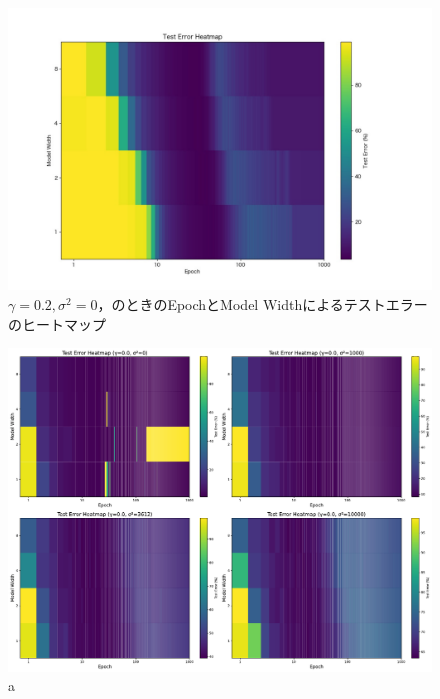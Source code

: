 \begin{figure}[H]
    \centering
    \includegraphics[width=\linewidth]{fig/test_error_heatmap_ln0.2.pdf}
    \caption{$\gamma = 0.2, \sigma^2 = 0$，のときのEpochとModel Widthによるテストエラーのヒートマップ}
    \label{fig:modelwidth_heatmap}
\end{figure}

\begin{figure}[H]
    \centering
    \includegraphics[width=\linewidth]{fig/heatmap_ln/ln0.pdf}
    \caption{a}
    \label{fig:modelwidth_heatmap_0}
\end{figure}

